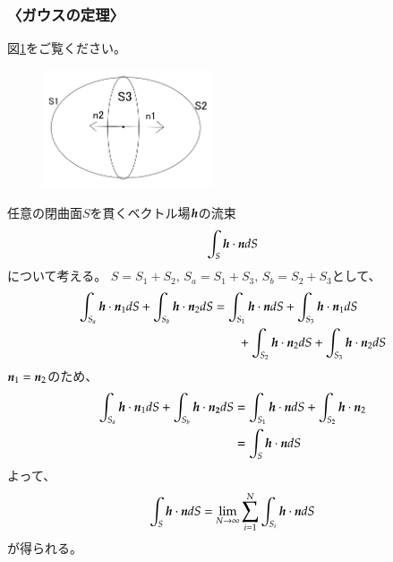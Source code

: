 \documentclass[10pt,b5paper,papersize,dvipdfmx]{jsbook}
\begin{document}
\subsubsection{〈ガウスの定理〉}
図\ref{fig:Gauss1}をご覧ください。
\begin{figure}[htbp]
  \centering
  \includegraphics[width=5cm]{img/Gauss}
  \caption{}
  \label{fig:Gauss1}
\end{figure}
任意の閉曲面$S$を貫くベクトル場$\vb*{h}$の流束
\begin{align}
  \int_S \vb*{h}\cdot\vb*{n}dS
\end{align}
について考える。
$S = S_1 + S_2,\, S_a = S_1 + S_3,\, S_b = S_2 + S_3$として、
\begin{align}
  \int_{S_a} \vb*{h}\cdot\vb*{n}_1 dS + \int_{S_b} \vb*{h}\cdot\vb*{n}_2 dS 
  &= \int_{S_1} \vb*{h}\cdot\vb*{n} dS + \int_{S_3} \vb*{h}\cdot\vb*{n}_1dS \notag\\
  &\qquad + \int_{S_2} \vb*{h}\cdot\vb*{n}_2 dS + \int_{S_3} \vb*{h}\cdot\vb*{n}_2 dS 
\end{align}
$\vb*{n}_1 = \vb*{n}_2$のため、
\begin{align}
  \int_{S_a} \vb*{h}\cdot\vb*{n}_1 dS + \int_{S_b} \vb*{h}\cdot\vb*{n_2} dS
  &= \int_{S_1} \vb*{h}\cdot\vb*{n} dS + \int_{S_2} \vb*{h}\cdot\vb*{n}_2 \notag \\
  &= \int_S \vb*{h}\cdot\vb*{n} dS
\end{align}
よって、
\begin{align}
  \int_S \vb*{h}\cdot\vb*{n} dS
  = \lim_{N \to \infty} \sum_{i=1}^N \int_{S_i} \vb*{h}\cdot\vb*{n} dS
\end{align}
が得られる。
\end{document}
